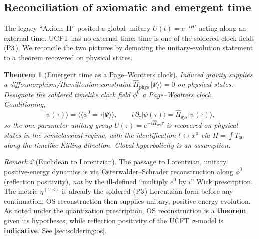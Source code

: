 \documentclass[11pt]{article}
\theoremstyle{plain}
\newtheorem{theorem}{Theorem}[section]
\theoremstyle{definition}
\theoremstyle{remark}
\newtheorem{remark}[theorem]{Remark}
\newcommand{\Pthree}{\textnormal{P3}}
\newcommand{\clock}{\phi^{0}}
\newcommand{\ket}[1]{\lvert #1\rangle}
\newcommand{\dket}[1]{\lvert #1\rangle\!\rangle}
\newcommand{\dbra}[1]{\langle\!\langle #1\rvert}
\begin{document}
\subsection{Reconciliation of axiomatic and emergent time}
\label{sec:axioms:time}

The legacy ``Axiom~II'' posited a global unitary $U(t)=e^{-iHt}$ acting along
an external time. UCFT has no external time: time is one of the soldered
clock fields ($\Pthree$). We reconcile the two pictures by demoting the
unitary-evolution statement to a theorem recovered on physical states.

\begin{theorem}[Emergent time as a Page--Wootters clock]\label{thm:axioms:time}
Induced gravity supplies a diffeomorphism/Hamiltonian constraint
$\widehat H_{\mathrm{phys}}\,\dket{\Psi}=0$ on physical states. Designate the
soldered timelike clock field $\clock$ a Page--Wootters clock. Conditioning,
\[
  \ket{\psi(\tau)}=\dbra{\clock=\tau}\Psi\rangle\!\rangle,
  \qquad
  i\,\partial_\tau\ket{\psi(\tau)}=\widehat H_{\mathrm{sys}}\ket{\psi(\tau)},
\]
so the one-parameter unitary group $U(\tau)=e^{-i\widehat H_{\mathrm{sys}}\tau}$
is recovered on physical states in the semiclassical regime, with the
identification $t\leftrightarrow x^0$ via
$H=\int T_{00}$ along the timelike Killing direction. Global hyperbolicity is
an assumption.
\end{theorem}

\begin{remark}[Euclidean to Lorentzian]\label{rem:axioms:os}
The passage to Lorentzian, unitary, positive-energy dynamics is via
Osterwalder--Schrader reconstruction along $\clock$ (reflection positivity),
\emph{not} by the ill-defined ``multiply $e^0$ by $i$'' Wick prescription.
The metric $\eta^{(1,3)}$ is already the soldered ($\Pthree$) Lorentzian form
before any continuation; OS reconstruction then supplies unitary,
positive-energy evolution. As noted under the quantization prescription, OS
reconstruction is a \textbf{theorem} given its hypotheses, while reflection
positivity of the UCFT $\sigma$-model is \textbf{indicative}. See
\autoref{sec:soldering:os}.
\end{remark}


\end{document}
